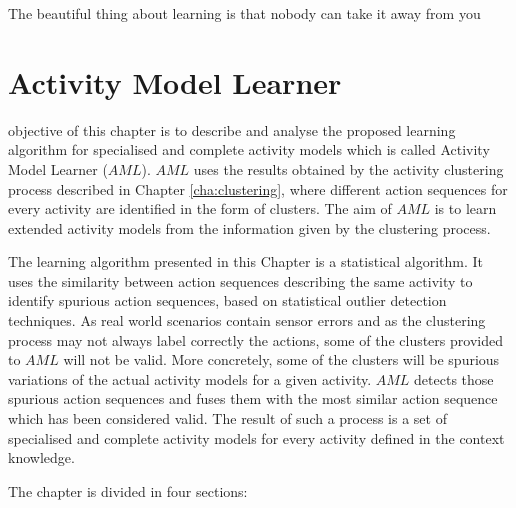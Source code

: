 

\begin{savequote}[50mm]
The beautiful thing about learning is that nobody can take it away from you
\end{savequote}


\chapter{Activity Model Learner}
\label{cha:learner}

\ifpdf
    \graphicspath{{5_activity_model_learner/figures/PDF/}{5_activity_model_learner/figures/PNG/}{5_activity_model_learner/figures/}}
\else
    \graphicspath{{5_activity_model_learner/figures/EPS/}{5_activity_model_learner/figures/}}
\fi

 objective of this chapter is to describe and analyse the proposed learning algorithm for specialised and complete activity models which is called Activity Model Learner ($AML$). $AML$ uses the results obtained by the activity clustering process described in Chapter \ref{cha:clustering}, where different action sequences for every activity are identified in the form of clusters. The aim of $AML$ is to learn extended activity models from the information given by the clustering process.

The learning algorithm presented in this Chapter is a statistical algorithm. It uses the similarity between action sequences describing the same activity to identify spurious action sequences, based on statistical outlier detection techniques. As real world scenarios contain sensor errors and as the clustering process may not always label correctly the actions, some of the clusters provided to $AML$ will not be valid. More concretely, some of the clusters will be spurious variations of the actual activity models for a given activity. $AML$ detects those spurious action sequences and fuses them with the most similar action sequence which has been considered valid. The result of such a process is a set of specialised and complete activity models for every activity defined in the context knowledge. 

The chapter is divided in four sections:

